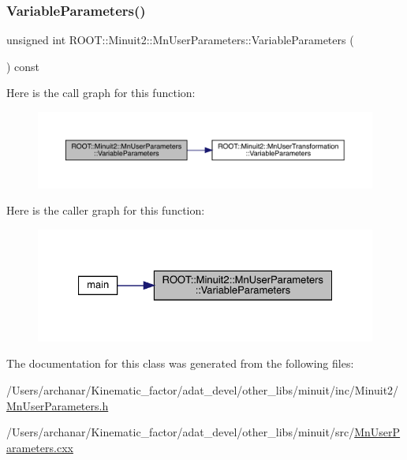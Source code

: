 \subsubsection{\texorpdfstring{VariableParameters()}{VariableParameters()}\hspace{0.1cm}{\footnotesize\ttfamily [2/2]}}
{\footnotesize\ttfamily unsigned int R\+O\+O\+T\+::\+Minuit2\+::\+Mn\+User\+Parameters\+::\+Variable\+Parameters (\begin{DoxyParamCaption}{ }\end{DoxyParamCaption}) const\hspace{0.3cm}{\ttfamily [inline]}}

Here is the call graph for this function\+:
\nopagebreak
\begin{figure}[H]
\begin{center}
\leavevmode
\includegraphics[width=350pt]{d6/d10/classROOT_1_1Minuit2_1_1MnUserParameters_af19ee84626fbdeb819e6a86e82794f19_cgraph}
\end{center}
\end{figure}
Here is the caller graph for this function\+:\nopagebreak
\begin{figure}[H]
\begin{center}
\leavevmode
\includegraphics[width=327pt]{d6/d10/classROOT_1_1Minuit2_1_1MnUserParameters_af19ee84626fbdeb819e6a86e82794f19_icgraph}
\end{center}
\end{figure}


The documentation for this class was generated from the following files\+:\begin{DoxyCompactItemize}
\item 
/\+Users/archanar/\+Kinematic\+\_\+factor/adat\+\_\+devel/other\+\_\+libs/minuit/inc/\+Minuit2/\mbox{\hyperlink{other__libs_2minuit_2inc_2Minuit2_2MnUserParameters_8h}{Mn\+User\+Parameters.\+h}}\item 
/\+Users/archanar/\+Kinematic\+\_\+factor/adat\+\_\+devel/other\+\_\+libs/minuit/src/\mbox{\hyperlink{MnUserParameters_8cxx}{Mn\+User\+Parameters.\+cxx}}\end{DoxyCompactItemize}
